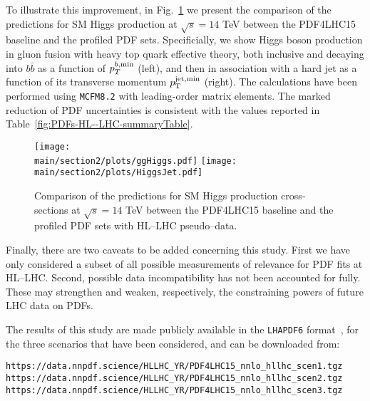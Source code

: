 To illustrate this improvement, in Fig.~\ref{fig:MCFMxsects}
we present the comparison of the predictions for 
    SM Higgs production at $\sqrt{s}=14$ TeV between the PDF4LHC15
    baseline and the profiled PDF sets.
    Specificially, we show
     Higgs boson production in gluon fusion with heavy top
      quark effective theory, both inclusive
      and decaying into $b\bar{b}$ as a function of $p_T^{b,\rm min}$ (left), and
      then in association with a hard jet as a function of its transverse
      momentum $p_{\rm T}^{\rm jet, min}$ (right).
      The calculations have been performed using {\tt MCFM8.2} with leading-order
      matrix elements.
      The marked reduction of PDF uncertainties is consistent with
      the values reported in Table~\ref{fig:PDFs-HL--LHC-summaryTable}.
     

\begin{figure}[t]
  \begin{center}
    \texttt{[image: \\main/section2/plots/ggHiggs.pdf]}
    \texttt{[image: \\main/section2/plots/HiggsJet.pdf]}
    \caption{\small Comparison of the predictions for 
    SM Higgs production cross-sections at $\sqrt{s}=14$ TeV between the PDF4LHC15
baseline and the profiled PDF sets with HL--LHC pseudo--data.
     \label{fig:MCFMxsects} }
  \end{center}
\end{figure}
 
      Finally, there are two caveats to be added concerning this study.
      First we have only considered a subset of all possible measurements of relevance for PDF fits at HL--LHC.
      Second, possible data incompatibility has not been
      accounted for fully. These may strengthen and weaken, respectively, the constraining powers of future LHC data on PDFs.
      
The results of this study are made
 publicly available in the {\tt LHAPDF6} format~\cite{Buckley:2014ana},
 for the three
 scenarios that have been considered, and can be
 downloaded from:
 \begin{center}
{\tt  https://data.nnpdf.science/HLLHC\_YR/PDF4LHC15\_nnlo\_hllhc\_scen1.tgz}\\
{\tt https://data.nnpdf.science/HLLHC\_YR/PDF4LHC15\_nnlo\_hllhc\_scen2.tgz}\\
{\tt https://data.nnpdf.science/HLLHC\_YR/PDF4LHC15\_nnlo\_hllhc\_scen3.tgz}
\end{center}


